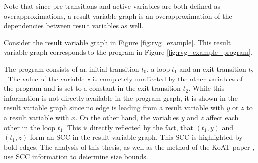 Note that since pre-transitions and active variables are both defined as overapproximations, a result variable graph is an overapproximation of the dependencies between result variables as well.

\begin{example}
  Consider the result variable graph in Figure \ref{fig:rvg_example}.
  This result variable graph corresponds to the program in Figure \ref{fig:rvg_example_program}.
  
  The program consists of an initial transition $t_0$, a loop $t_1$ and an exit transition $t_2$.
  The value of the variable $x$ is completely unaffected by the other variables of the program and is set to a constant in the exit transition $t_2$.
  While this information is not directly available in the program graph, it is shown in the result variable graph since no edge is leading from a result variable with $y$ or $z$ to a result variable with $x$.
  On the other hand, the variables $y$ and $z$ affect each other in the loop $t_1$.
  This is directly reflected by the fact, that $(t_1,y)$ and $(t_1,z)$ form an SCC in the result variable graph.
  This SCC is highlighted by bold edges.
  The analysis of this thesis, as well as the method of the KoAT paper \cite{koat}, use SCC information to determine size bounds.
\end{example}

